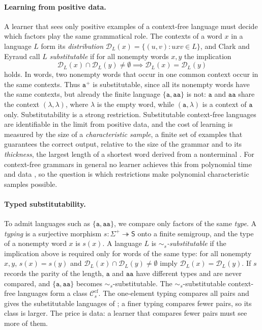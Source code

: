 \documentclass[11pt]{article}
\numberwithin{equation}{section}
\theoremstyle{plain}
\theoremstyle{definition}
\theoremstyle{remark}
\theoremstyle{plain}
\newcommand{\cf}{\mathrm{cf}}
\newcommand{\Ccf}[1]{\mathcal C_{#1}^{\cf}}
\newcommand{\D}{\mathcal{D}}
\begin{document}
\paragraph{Learning from positive data.}
A learner that sees only positive examples of a context-free language must
decide which factors play the same grammatical role.  The contexts of a word
$x$ in a language $L$ form its \emph{distribution}
$\D_L(x)=\{(u,v):uxv\in L\}$, and Clark and Eyraud \cite{ClarkEyraud2007}
call $L$ \emph{substitutable} if for all nonempty words $x,y$ the
implication
\[
 \D_L(x)\cap\D_L(y)\ne\emptyset \implies \D_L(x)=\D_L(y)
\]
holds.  In words, two nonempty words that occur in one common context occur in the
same contexts.  Thus $\mathtt a^+$ is substitutable, since all its nonempty
words have the same contexts, but already the finite language
$\{\mathtt a,\mathtt{aa}\}$ is not: $\mathtt a$ and $\mathtt{aa}$ share the
context $(\lambda,\lambda)$, where $\lambda$ is the empty word, while
$(\mathtt a,\lambda)$ is a context of $\mathtt a$ only.  Substitutability is
a strong restriction.  Substitutable context-free languages are identifiable in the limit from positive data, and the cost of
learning is measured by the size of a \emph{characteristic sample}, a finite
set of examples that guarantees the correct output, relative to the size of
the grammar and to its \emph{thickness}, the largest length of a shortest
word derived from a nonterminal \cite{ClarkEyraud2007,Yoshinaka2008}.  For
context-free grammars in general no learner achieves this from polynomial
time and data \cite{delaHiguera1997}, so the question is which restrictions
make polynomial characteristic samples possible.

\paragraph{Typed substitutability.}
To admit languages such as $\{\mathtt a,\mathtt{aa}\}$, we compare only factors
of the same \emph{type}.
A \emph{typing} is a surjective morphism
$s:\Sigma^+\twoheadrightarrow\mathsf S$ onto a finite semigroup, and the type
of a nonempty word $x$ is $s(x)$.  A language $L$ is
\emph{$\sim_s$-substitutable} if the implication above is required only for
words of the same type: for all nonempty $x,y$, $s(x)=s(y)$ and
$\D_L(x)\cap\D_L(y)\ne\emptyset$ imply $\D_L(x)=\D_L(y)$.  If $s$ records
the parity of the length, $\mathtt a$ and $\mathtt{aa}$ have different types
and are never compared, and $\{\mathtt a,\mathtt{aa}\}$ becomes
$\sim_s$-substitutable.  The $\sim_s$-substitutable context-free languages form a class $\Ccf{s}$.  The
one-element typing compares all pairs and gives the substitutable languages
of \cite{ClarkEyraud2007}; a finer typing compares fewer pairs, so its class
is larger.  The price is
data: a learner that compares fewer pairs must see more of them.
\end{document}
